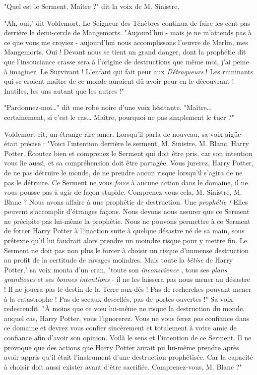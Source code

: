 "Quel est le Serment, Maître ?" dit la voix de M. Sinistre.

"Ah, oui," dit Voldemort. Le Seigneur des Ténèbres continua de faire les cent pas derrière le demi-cercle de Mangemorts. "Aujourd'hui - mais je ne m'attends pas à ce que vous me croyiez - aujourd'hui nous accomplissons l'œuvre de Merlin, mes Mangemorts. Oui ! Devant nous se tient un grand danger, dont la prophétie dit que l'insouciance crasse sera à l'origine de destructions que même moi, j'ai peine à imaginer. Le Survivant ! L'enfant qui fait peur aux \emph{Détraqueurs}  ! Les ruminants qui se croient maître de ce monde auraient dû avoir peur en le découvrant ! Inutiles, les uns autant que les autres !"

"Pardonnez-moi…" dit une robe noire d'une voix hésitante. "Maître… certainement, si c'est le cas… Maître, pourquoi ne pas simplement le tuer ?"

Voldemort rit, un étrange rire amer. Lorsqu'il parla de nouveau, sa voix aigüe était précise : "Voici l'intention derrière le serment, M. Sinistre, M. Blanc, Harry Potter. Écoutez bien et comprenez le Serment qui doit être pris, car son intention vous lie aussi, et sa compréhension doit être partagée. Vous jurerez, Harry Potter, de ne pas détruire le monde, de ne prendre aucun risque lorsqu'il s'agira de ne pas le détruire. Ce Serment ne vous \emph{force}  à aucune action dans le domaine, il ne vous pousse pas à agir de façon stupide. Comprenez-vous cela, M. Sinistre, M. Blanc ? Nous avons affaire à une prophétie de destruction. Une \emph{prophétie !}  Elles peuvent s'accomplir d'étranges façons. Nous devons nous assurer que ce Serment ne précipite pas lui-même la prophétie. Nous ne pouvons permettre à ce Serment de forcer Harry Potter à l'inaction suite à quelque désastre né de sa main, sous prétexte qu'il lui faudrait alors prendre un moindre risque pour y mettre fin. Le Serment ne doit pas non plus le forcer à choisir un risque d'immense destruction au profit de la certitude de ravages moindres. Mais toute la \emph{bêtise}  de Harry Potter," sa voix monta d'un cran, "toute son \emph{inconscience} , tous ses \emph{plans grandioses}  et ses \emph{bonnes intentions}  - il ne les laissera pas nous mener au désastre ! Il ne jouera pas le destin de la Terre aux dés ! Pas de recherches pouvant mener à la catastrophe ! Pas de sceaux descellés, pas de portes ouvertes !" Sa voix redescendit. "À moins que ce vœu lui-même ne risque la destruction du monde, auquel cas, Harry Potter, vous l'ignorerez. Vous ne vous ferez \emph{pas}  confiance dans ce domaine et devrez vous confier sincèrement et totalement à votre amie de confiance afin d'avoir son opinion. Voilà le sens et l'intention de ce Serment. Il ne provoque que des actions que Harry Potter aurait pu lui-même prendre après avoir appris qu'il était l'instrument d'une destruction prophétisée. Car la capacité à choisir doit aussi exister avant d'être sacrifiée. Comprenez-vous, M. Blanc ?"

